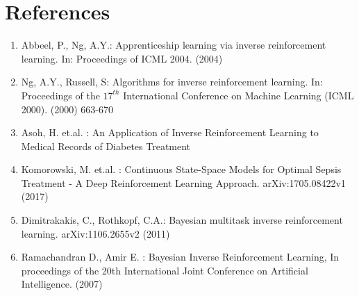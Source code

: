 \documentclass[twoside,11pt]{article}
\begin{document}



\section*{References}
\begin{enumerate}
\item Abbeel, P., Ng, A.Y.: Apprenticeship learning via inverse reinforcement learning. In: Proceedings of ICML 2004. (2004)
\item Ng, A.Y., Russell, S: Algorithms for inverse reinforcement learning. In: Proceedings of the $17^{th}$ International Conference on Machine Learning (ICML 2000). (2000) 663-670
\item Asoh, H. et.al. : An Application of Inverse Reinforcement Learning to Medical Records of Diabetes Treatment
\item Komorowski, M. et.al. : Continuous State-Space Models for Optimal Sepsis Treatment - A Deep
Reinforcement Learning Approach. arXiv:1705.08422v1 (2017)
\item Dimitrakakis, C., Rothkopf, C.A.: Bayesian multitask inverse reinforcement learning. arXiv:1106.2655v2 (2011)
\item Ramachandran D., Amir E. : Bayesian Inverse Reinforcement Learning, In proceedings of the 20th International Joint Conference on Artificial Intelligence. (2007)
\end{enumerate}
\end{document}
